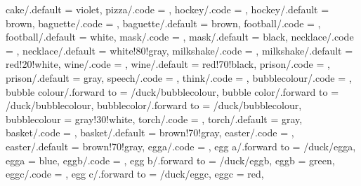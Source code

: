 {  cake/.default             = violet,
  pizza/.code               = \duck@pizzatrue,
  hockey/.code              = \duck@hockeytrue      
                              \def\duck@hockey{#1},
  hockey/.default           = brown,
  baguette/.code            = \duck@baguettetrue    
                              \def\duck@baguette{#1},
  baguette/.default         = brown,
  football/.code            = \duck@footballtrue    
                              \def\duck@football{#1},
  football/.default         = white,
  mask/.code                = \duck@masktrue        
                              \def\duck@mask{#1},
  mask/.default             = black,
  necklace/.code            = \duck@necklacetrue    
                              \def\duck@necklace{#1},
  necklace/.default         = white!80!gray,
  milkshake/.code           = \duck@milkshaketrue   
                              \def\duck@milkshake{#1},
  milkshake/.default        = red!20!white,
  wine/.code                = \duck@winetrue        
                              \def\duck@wine{#1},  
  wine/.default             = red!70!black,
  prison/.code              = \duck@prisontrue      
                              \def\duck@prison{#1},
  prison/.default           = gray,
  speech/.code              = \duck@speechtrue      
                              \def\duck@speech{#1},
  think/.code               = \duck@thinktrue       
                              \def\duck@think{#1},
  bubblecolour/.code        = \def\duck@bubblecolour{#1},
  bubble colour/.forward to = /duck/bubblecolour,
  bubble color/.forward to  = /duck/bubblecolour,
  bubblecolor/.forward to   = /duck/bubblecolour,  
  bubblecolour              = gray!30!white,
  torch/.code               = \duck@torchtrue       
                              \def\duck@torch{#1},
  torch/.default            = gray,
  basket/.code              = \duck@baskettrue      
                              \def\duck@basket{#1},
  basket/.default           = brown!70!gray,
  easter/.code              = \duck@eastertrue
                              \duck@baskettrue      
                              \def\duck@basket{#1},
  easter/.default           = brown!70!gray,                       
  egga/.code                = \def\duck@egga{#1},
  egg a/.forward to         = /duck/egga,
  egga                      = blue,
  eggb/.code                = \def\duck@eggb{#1},
  egg b/.forward to         = /duck/eggb,
  eggb                      = green,
  eggc/.code                = \def\duck@eggc{#1},
  egg c/.forward to         = /duck/eggc,
  eggc                      = red,
}
